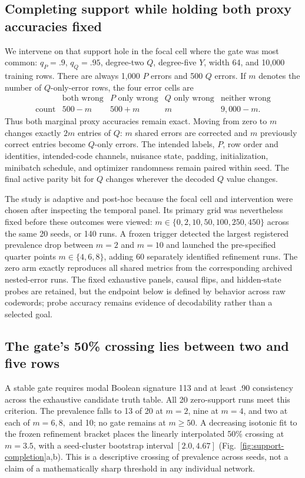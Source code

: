\documentclass[11pt,a4paper]{article}
\newcommand{\fig}[1]{Fig.~\ref{#1}}
\begin{document}
\subsection*{Completing support while holding both proxy accuracies fixed}

We intervene on that support hole in the focal cell where the gate was most common: $q_P=.9$, $q_Q=.95$, degree-two $Q$, degree-five $Y$, width 64, and 10,000 training rows. There are always 1,000 $P$ errors and 500 $Q$ errors. If $m$ denotes the number of $Q$-only-error rows, the four error cells are
\[
\begin{array}{c|cccc}
&\text{both wrong}&P\text{ only wrong}&Q\text{ only wrong}&\text{neither wrong}\\
\hline
\text{count}&500-m&500+m&m&9{,}000-m.
\end{array}
\]
Thus both marginal proxy accuracies remain exact. Moving from zero to $m$ changes exactly $2m$ entries of $Q$: $m$ shared errors are corrected and $m$ previously correct entries become $Q$-only errors. The intended labels, $P$, row order and identities, intended-code channels, nuisance state, padding, initialization, minibatch schedule, and optimizer randomness remain paired within seed. The final active parity bit for $Q$ changes wherever the decoded $Q$ value changes.

The study is adaptive and post-hoc because the focal cell and intervention were chosen after inspecting the temporal panel. Its primary grid was nevertheless fixed before these outcomes were viewed: $m\in\{0,2,10,50,100,250,450\}$ across the same 20 seeds, or 140 runs. A frozen trigger detected the largest registered prevalence drop between $m=2$ and $m=10$ and launched the pre-specified quarter points $m\in\{4,6,8\}$, adding 60 separately identified refinement runs. The zero arm exactly reproduces all shared metrics from the corresponding archived nested-error runs. The fixed exhaustive panels, causal flips, and hidden-state probes are retained, but the endpoint below is defined by behavior across raw codewords; probe accuracy remains evidence of decodability rather than a selected goal.

\subsection*{The gate's 50\% crossing lies between two and five rows}

A stable gate requires modal Boolean signature 113 and at least .90 consistency across the exhaustive candidate truth table. All 20 zero-support runs meet this criterion. The prevalence falls to 13 of 20 at $m=2$, nine at $m=4$, and two at each of $m=6,8,$ and 10; no gate remains at $m\geq50$. A decreasing isotonic fit to the frozen refinement bracket places the linearly interpolated 50\% crossing at $m=3.5$, with a seed-cluster bootstrap interval $[2.0,4.67]$ (\fig{fig:support-completion}a,b). This is a descriptive crossing of prevalence across seeds, not a claim of a mathematically sharp threshold in any individual network.
\end{document}
